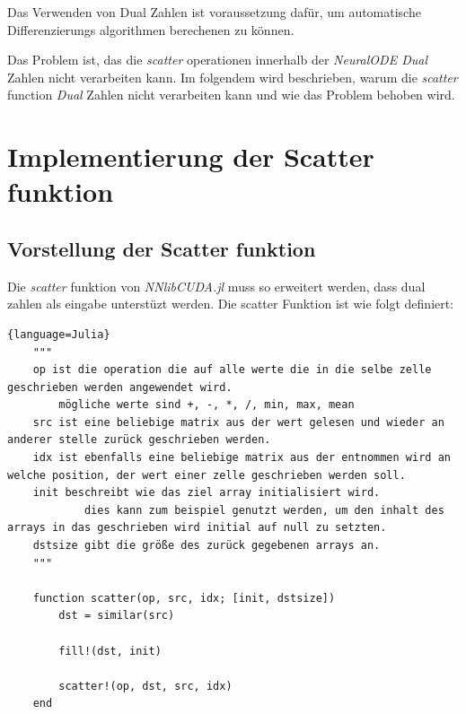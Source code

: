 Das Verwenden von Dual Zahlen ist voraussetzung dafür, um automatische Differenzierungs algorithmen berechenen zu können.

Das Problem ist, das die \textit{scatter} operationen innerhalb der \textit{NeuralODE Dual} Zahlen nicht verarbeiten kann.
Im folgendem wird beschrieben, warum die \textit{scatter} function \textit{Dual} Zahlen nicht verarbeiten kann und wie das Problem behoben wird.



\section{Implementierung der Scatter funktion} \label{sec:implementation_scatter}

\subsection{Vorstellung der Scatter funktion} \label{sec:scatter}


Die \textit{scatter} funktion von \textit{NNlibCUDA.jl} muss so erweitert werden, dass dual zahlen als eingabe unterstüzt werden.
Die scatter Funktion ist wie folgt definiert:


\begin{lstlisting}{language=Julia}
	"""
	op ist die operation die auf alle werte die in die selbe zelle geschrieben werden angewendet wird.
		mögliche werte sind +, -, *, /, min, max, mean
	src ist eine beliebige matrix aus der wert gelesen und wieder an anderer stelle zurück geschrieben werden.
	idx ist ebenfalls eine beliebige matrix aus der entnommen wird an welche position, der wert einer zelle geschrieben werden soll.
	init beschreibt wie das ziel array initialisiert wird.
			dies kann zum beispiel genutzt werden, um den inhalt des arrays in das geschrieben wird initial auf null zu setzten.
	dstsize gibt die größe des zurück gegebenen arrays an.
	"""

	function scatter(op, src, idx; [init, dstsize])
		dst = similar(src)
		
		fill!(dst, init)
		
		scatter!(op, dst, src, idx)
	end
\end{lstlisting}


